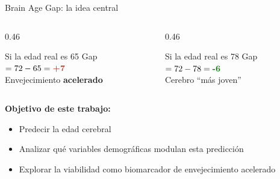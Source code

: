 \documentclass[aspectratio=169, 11pt]{beamer}
\newcommand{\highlight}[1]{\textcolor{uncaccent}{\textbf{#1}}}
\begin{document}
\begin{frame}{Brain Age Gap: la idea central}
  \centering
  \shorthandoff{>}
  \shorthandon{>}

  \vspace{0.4cm}
  \begin{columns}[T]
    \begin{column}{0.46\textwidth}
      \begin{block}{Si la edad real es 65}
        \centering
        Gap $= 72 - 65 = \highlight{+7}$\\[3pt]
        {\small Envejecimiento \textbf{acelerado}}
      \end{block}
    \end{column}
    \begin{column}{0.46\textwidth}
      \begin{block}{Si la edad real es 78}
        \centering
        Gap $= 72 - 78 = \textcolor{green!50!black}{\textbf{-6}}$\\[3pt]
        {\small Cerebro ``más joven''}
      \end{block}
    \end{column}
  \end{columns}

  \vspace{0.3cm}
  {\small \textbf{Objetivo de este trabajo:} 
  \begin{itemize}
    \item Predecir la edad cerebral
    \item Analizar qué variables demográficas modulan esta predicción
    \item Explorar la viabilidad como biomarcador de envejecimiento acelerado
  \end{itemize}
  }
\end{frame}
\end{document}
